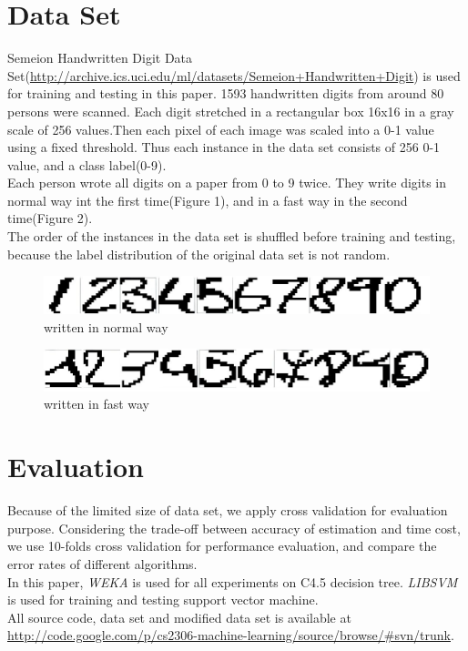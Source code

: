 \documentclass[a4paper,11pt]{nurop}
\begin{document}
\section{Data Set}
Semeion Handwritten Digit Data Set(\url{http://archive.ics.uci.edu/ml/datasets/Semeion+Handwritten+Digit}) is used for training and testing in this paper. 1593 handwritten digits from around 80 persons were scanned. Each digit stretched in a rectangular box 16x16 in a gray scale of 256 values.Then each pixel of each image was scaled into a 0-1 value using a fixed threshold. Thus each instance in the data set consists of 256 0-1 value, and a class label(0-9).\\
Each person wrote all digits on a paper from 0 to 9 twice. They write digits in normal way int the first time(Figure 1), and in a fast way in the second time(Figure 2).\\
The order of the instances in the data set is shuffled before training and testing, because the label distribution of the original data set is not random.
\begin{figure}
\centering
\includegraphics[width=1.0\textwidth]{clear}
\caption{written in normal way}
\end{figure}

\begin{figure}
\centering
\includegraphics[width=1.0\textwidth]{unclear}
\caption{written in fast way}
\end{figure}

\section{Evaluation}

Because of the limited size of data set, we apply cross validation for evaluation purpose. Considering the trade-off between accuracy of estimation and time cost, we use 10-folds cross validation for performance evaluation, and compare the error rates of different algorithms.\\
In this paper, \emph{WEKA}\cite{weka} is used for all experiments on C4.5 decision tree. \emph{LIBSVM}\cite{libsvm} is used for training and testing support vector machine.\\
All source code, data set and modified data set is available at \url{http://code.google.com/p/cs2306-machine-learning/source/browse/#svn/trunk}.
\end{document}
